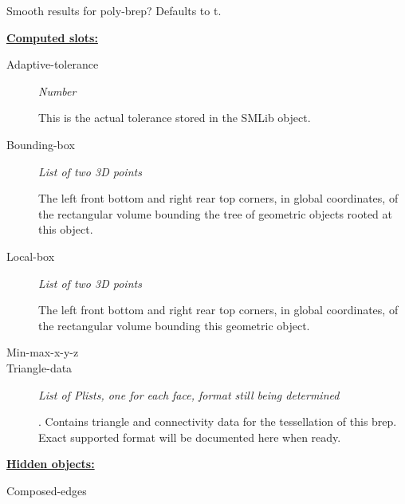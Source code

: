 \documentclass [11pt]{book}
\begin{document}
\begin{itemize}
\begin{description}
 Smooth results for poly-brep? Defaults to t.




\end{description}






\textbf{
\underline{Computed slots:}}

\begin{description}

\item [Adaptive-tolerance]
\emph{Number}

 This is the actual tolerance stored in the SMLib object.




\item [Bounding-box]
\emph{List of two 3D points}

 The left front bottom and right rear top corners, in global coordinates,
of the rectangular volume bounding the tree of geometric objects rooted at this object.




\item [Local-box]
\emph{List of two 3D points}

 The left front bottom and right rear top corners, in global coordinates,
of the rectangular volume bounding this geometric object.




\item [Min-max-x-y-z]





\item [Triangle-data]
\emph{List of Plists, one for each face, format still being determined}

.
Contains triangle and connectivity data for the tessellation
of this brep. Exact supported format will be documented here when ready.




\end{description}






\textbf{
\underline{Hidden objects:}}

\begin{description}

\item [Composed-edges]


\end{description}
\end{itemize}
\end{document}
